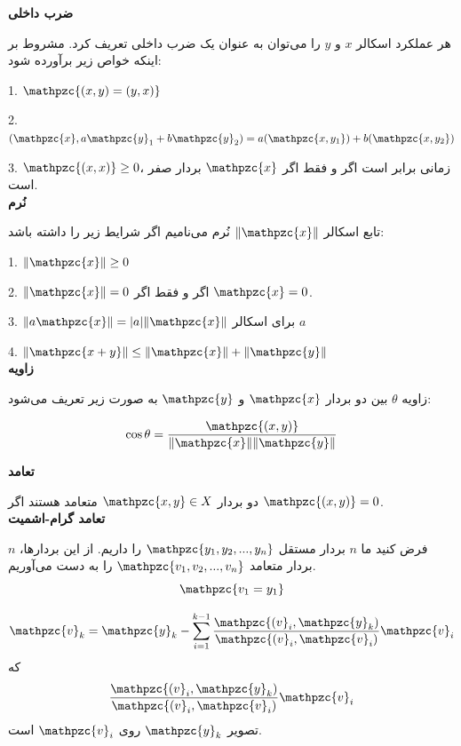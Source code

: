 \documentclass[a4paper,12pt]{report}
\begin{document}
   	
   	\textbf{\large{ضرب داخلی}}
   	
   	هر عملکرد اسکالر $ x $ و $ y $ را می‌توان به عنوان یک ضرب داخلی تعریف کرد. مشروط بر اینکه خواص زیر برآورده شود:
   	
   	1. $ \mathpzc{(x,y)=(y,x)} $
   	
   	2. $ (\mathpzc{x},a\mathpzc{y}_1+b\mathpzc{y}_2)=a(\mathpzc{x,y_1})+b(\mathpzc{x,y_2}) $
   	
   	3. $ \mathpzc{(x,x)} \geq 0 $،
   	زمانی برابر است اگر و فقط اگر $ \mathpzc{x} $ بردار صفر است.\\
   	
   	\textbf{\large{نُرم}}
   	
   	تابع اسکالر 
   	$ \Vert \mathpzc{x} \Vert$
   	نُرم می‌نامیم اگر شرایط زیر را داشته باشد:
   	
   	1. $ \Vert \mathpzc{x} \Vert \geq 0 $
   	
   	2. $ \Vert \mathpzc{x} \Vert = 0 $ اگر و فقط اگر $ \mathpzc{x}=0 $.	
   	
   	3. $ \Vert a\mathpzc{x} \Vert = \vert a \vert \Vert \mathpzc{x} \Vert $ برای اسکالر $ a $
   	
   	4. $ \Vert \mathpzc{x+y} \Vert \leq \Vert \mathpzc{x} \Vert + \Vert \mathpzc{y} \Vert $\\
   	
   	\textbf{\large{زاویه}}
   	
   	زاویه $ \theta $ بین دو بردار $ \mathpzc{x} $ و $ \mathpzc{y} $ به صورت زیر تعریف می‌شود:
   	
   	$$
   	\cos \theta = \frac{\mathpzc{(x,y)}}{\Vert \mathpzc{x} \Vert \Vert \mathpzc{y} \Vert}
   	$$
   	
   	\textbf{\large{تعامد}}
   	
   	دو بردار $ \mathpzc{x,y} \in X $ متعامد هستند اگر $ \mathpzc{(x,y)}=0 $.\\
   	
   	\textbf{\large{تعامد گرام-اشمیت}}
   	
   	فرض کنید ما $ n $ بردار مستقل 
   	$ \mathpzc{y_1,y_2,...,y_n} $
   	را داریم. از این بردارها، $ n $ بردار متعامد 
   	$ \mathpzc{v_1,v_2,...,v_n} $
   	را به دست می‌آوریم.
   	$$
   	\mathpzc{v_1=y_1}
   	$$
   	
   	$$
   	\mathpzc{v}_k=\mathpzc{y}_k-\sum_{i=1}^{k-1}\frac{\mathpzc{(v}_i,\mathpzc{y}_k)}{\mathpzc{(v}_i,\mathpzc{v}_i)}\mathpzc{v}_i
   	$$
   	که
   	$$
   	\frac{\mathpzc{(v}_i,\mathpzc{y}_k)}{\mathpzc{(v}_i,\mathpzc{v}_i)}\mathpzc{v}_i
   	$$
   	تصویر 
   	$ \mathpzc{y}_k $
   	 روی
    $ \mathpzc{v}_i $
     است.\\
     
\end{document}
